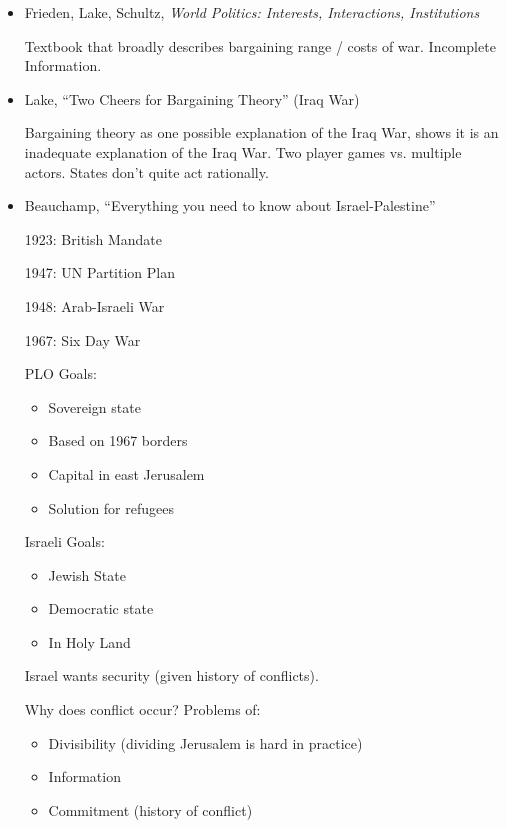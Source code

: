 \documentclass{article}
\begin{document}
\begin{itemize}
    \item Frieden, Lake, Schultz, {\it World Politics: Interests, Interactions, Institutions}

      Textbook that broadly describes bargaining range / costs of war.  Incomplete Information.

    \item Lake, ``Two Cheers for Bargaining Theory'' (Iraq War)

      Bargaining theory as one possible explanation of the Iraq War, shows it is an inadequate explanation of the Iraq War.  Two player games vs. multiple actors. States don't quite act rationally.

    \item Beauchamp, ``Everything you need to know about Israel-Palestine''

      1923: British Mandate

      1947: UN Partition Plan

      1948: Arab-Israeli War

      1967: Six Day War

      PLO Goals:

      \begin{itemize}
        \item Sovereign state
        \item Based on 1967 borders
        \item Capital in east Jerusalem
        \item Solution for refugees
      \end{itemize}

      Israeli Goals:

      \begin{itemize}
        \item Jewish State
        \item Democratic state
        \item In Holy Land
      \end{itemize}

      Israel wants security (given history of conflicts).

      Why does conflict occur?  Problems of:

      \begin{itemize}
        \item Divisibility (dividing Jerusalem is hard in practice)
        \item Information
        \item Commitment (history of conflict)
      \end{itemize}


\end{itemize}
\end{document}

